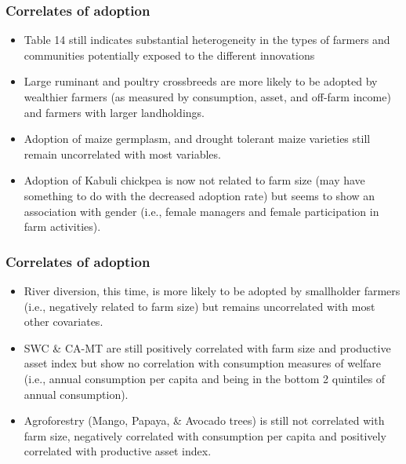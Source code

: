 \documentclass[11pt]{beamer}
\begin{document}
\begin{frame}
\label{scndpg}
\frametitle{Correlates of adoption}
\begin{itemize}
\item Table 14 still indicates substantial heterogeneity in the types of farmers and communities potentially exposed to the different innovations

\item Large ruminant and poultry crossbreeds are more likely to be adopted by wealthier farmers (as measured by consumption, asset, and off-farm income) and farmers with larger landholdings. \hyperlink{tab14fig1}{}

\item Adoption of maize germplasm, and drought tolerant maize varieties still remain uncorrelated with most variables. 

\item Adoption of Kabuli chickpea is now not related to farm size (may have something to do with the decreased adoption rate) but seems to show an association with gender (i.e., female managers and female participation in farm activities). \hyperlink{tab14fig2}{}

\end{itemize}

\end{frame}


\begin{frame}
\label{thrdpg}
\frametitle{Correlates of adoption}
\begin{itemize}

\item River diversion, this time, is more likely to be adopted by smallholder farmers (i.e., negatively related to farm size) but remains uncorrelated with most other covariates. \hyperlink{tab14fig3}{}

\item SWC \& CA-MT are still positively correlated with farm size and productive asset index but show no correlation with consumption measures of welfare (i.e., annual consumption per capita and being in the bottom 2 quintiles of annual consumption). \hyperlink{tab14fig3}{} 

\item Agroforestry (Mango, Papaya, \& Avocado trees) is still not correlated with farm size, negatively correlated with consumption per capita and positively correlated with productive asset index. \hyperlink{tab14fig3}{}
\end{itemize}

\end{frame}
\end{document}
